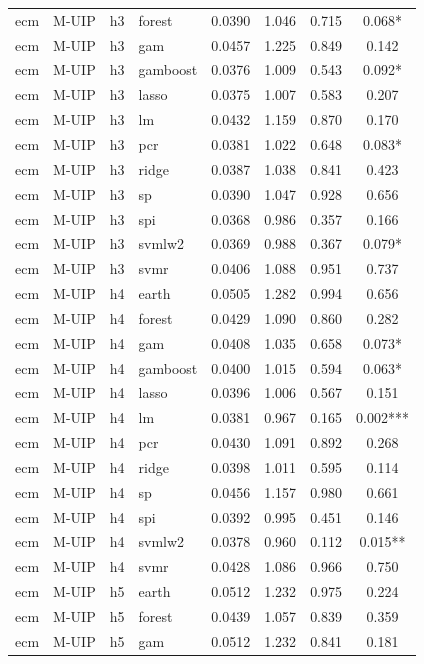 \begin{ThreePartTable}
\begin{longtable}[t]{llclcccc}
ecm & M-UIP & h3 & forest & 0.0390 & 1.046 & 0.715 & 0.068*\\
ecm & M-UIP & h3 & gam & 0.0457 & 1.225 & 0.849 & 0.142\\
ecm & M-UIP & h3 & gamboost & 0.0376 & 1.009 & 0.543 & 0.092*\\
ecm & M-UIP & h3 & lasso & 0.0375 & 1.007 & 0.583 & 0.207\\
ecm & M-UIP & h3 & lm & 0.0432 & 1.159 & 0.870 & 0.170\\
ecm & M-UIP & h3 & pcr & 0.0381 & 1.022 & 0.648 & 0.083*\\
ecm & M-UIP & h3 & ridge & 0.0387 & 1.038 & 0.841 & 0.423\\
ecm & M-UIP & h3 & sp & 0.0390 & 1.047 & 0.928 & 0.656\\
ecm & M-UIP & h3 & spi & 0.0368 & 0.986 & 0.357 & 0.166\\
ecm & M-UIP & h3 & svmlw2 & 0.0369 & 0.988 & 0.367 & 0.079*\\
ecm & M-UIP & h3 & svmr & 0.0406 & 1.088 & 0.951 & 0.737\\
\addlinespace
ecm & M-UIP & h4 & earth & 0.0505 & 1.282 & 0.994 & 0.656\\
ecm & M-UIP & h4 & forest & 0.0429 & 1.090 & 0.860 & 0.282\\
ecm & M-UIP & h4 & gam & 0.0408 & 1.035 & 0.658 & 0.073*\\
ecm & M-UIP & h4 & gamboost & 0.0400 & 1.015 & 0.594 & 0.063*\\
ecm & M-UIP & h4 & lasso & 0.0396 & 1.006 & 0.567 & 0.151\\
ecm & M-UIP & h4 & lm & 0.0381 & 0.967 & 0.165 & 0.002***\\
ecm & M-UIP & h4 & pcr & 0.0430 & 1.091 & 0.892 & 0.268\\
ecm & M-UIP & h4 & ridge & 0.0398 & 1.011 & 0.595 & 0.114\\
ecm & M-UIP & h4 & sp & 0.0456 & 1.157 & 0.980 & 0.661\\
ecm & M-UIP & h4 & spi & 0.0392 & 0.995 & 0.451 & 0.146\\
ecm & M-UIP & h4 & svmlw2 & 0.0378 & 0.960 & 0.112 & 0.015**\\
ecm & M-UIP & h4 & svmr & 0.0428 & 1.086 & 0.966 & 0.750\\
\addlinespace
ecm & M-UIP & h5 & earth & 0.0512 & 1.232 & 0.975 & 0.224\\
ecm & M-UIP & h5 & forest & 0.0439 & 1.057 & 0.839 & 0.359\\
ecm & M-UIP & h5 & gam & 0.0512 & 1.232 & 0.841 & 0.181\\

\end{longtable}
\end{ThreePartTable}
